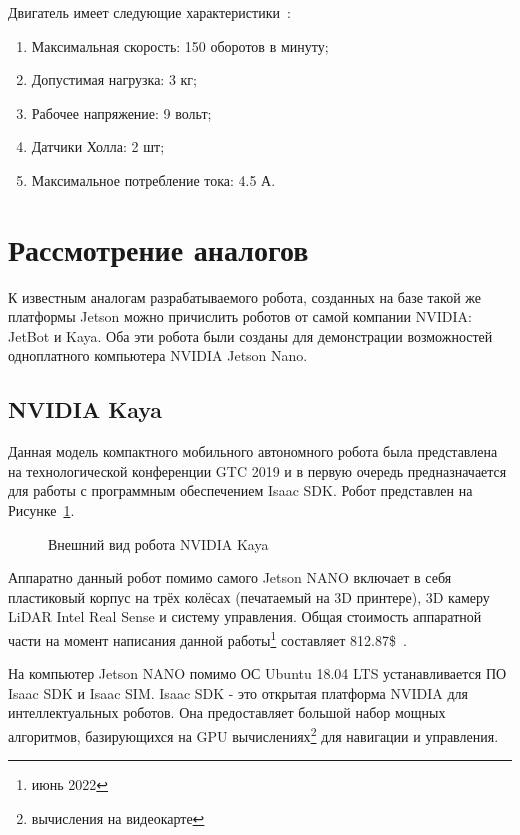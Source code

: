 Двигатель имеет следующие характеристики~\cite{motor}:
\begin{enumerate}[beginpenalty=10000] %
  \item Максимальная скорость: 150 оборотов в минуту;
  \item Допустимая нагрузка: 3 кг;
  \item Рабочее напряжение: 9 вольт;
  \item Датчики Холла: 2 шт;
  \item Максимальное потребление тока: 4.5 А.
\end{enumerate}

\section{Рассмотрение аналогов}
К известным аналогам разрабатываемого робота, созданных на базе такой же платформы Jetson можно причислить роботов от самой компании NVIDIA: JetBot и Kaya. Оба эти робота были созданы для демонстрации возможностей одноплатного компьютера NVIDIA Jetson Nano.

\subsection{NVIDIA Kaya}
Данная модель компактного мобильного автономного робота была представлена на технологической конференции GTC 2019 и в первую очередь предназначается для работы с программным обеспечением Isaac SDK. Робот представлен на Рисунке~\cref{fig:kaya}.

\begin{figure}[ht]
    \caption{Внешний вид робота NVIDIA Kaya}\label{fig:kaya}
\end{figure}

Аппаратно данный робот помимо самого Jetson NANO включает в себя пластиковый корпус на трёх колёсах (печатаемый на 3D принтере), 3D камеру LiDAR Intel Real Sense и систему управления. Общая стоимость аппаратной части на момент написания данной работы\footnote{июнь 2022} составляет 812.87\$~\cite{kaya}.

На компьютер Jetson NANO помимо ОС Ubuntu 18.04 LTS устанавливается ПО Isaac SDK и Isaac SIM. Isaac SDK - это открытая платформа NVIDIA для интеллектуальных роботов. Она предоставляет большой набор мощных алгоритмов, базирующихся на GPU вычислениях\footnote{вычисления на видеокарте} для навигации и управления.

